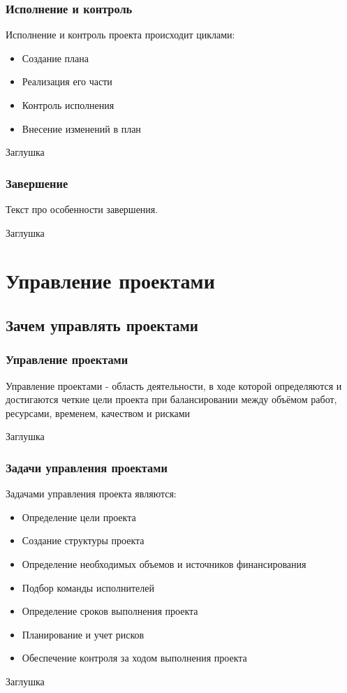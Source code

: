 \documentclass{../industrial-development}
\begin{document}
    \begin{frame} \frametitle{Исполнение и контроль}
        Исполнение и контроль проекта происходит циклами:
        \begin{itemize}
            \item Создание плана
            \item Реализация его части
            \item Контроль исполнения
            \item Внесение изменений в план
        \end{itemize}
    \end{frame}
    \lecturenotes
    Заглушка

    \begin{frame} \frametitle{Завершение}
        Текст про особенности завершения.
    \end{frame}
    \lecturenotes
    Заглушка

    \section{Управление проектами}

    \subsection{Зачем управлять проектами}

    \begin{frame} \frametitle{Управление проектами}
        \begin{definition}
            Управление проектами - область деятельности, в ходе которой определяются и достигаются четкие цели проекта при балансировании между объёмом работ, ресурсами, временем, качеством и рисками
        \end{definition}
    \end{frame}
    \lecturenotes
    Заглушка

    \begin{frame} \frametitle{Задачи управления проектами}
        Задачами управления проекта являются:
        \begin{itemize}
            \item Определение цели проекта
            \item Создание структуры проекта
            \item Определение необходимых объемов и источников финансирования
            \item Подбор команды исполнителей
            \item Определение сроков выполнения проекта
            \item Планирование и учет рисков
            \item Обеспечение контроля за ходом выполнения проекта
        \end{itemize}
    \end{frame}
    \lecturenotes
    Заглушка
\end{document}
